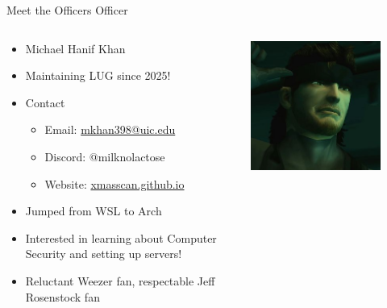 \documentclass{beamer}
\begin{document}
\begin{frame}{Meet the Officers}
	{\Huge Officer}
	\begin{columns}
		\begin{column}{0.5\textwidth}
			\begin{itemize}
				\item {\Large Michael Hanif Khan}
				\item Maintaining LUG since 2025!
				\item Contact
				      \begin{itemize}
					      \item Email: \href{mailto:mkhan398@uic.edu}{mkhan398@uic.edu}
					      \item Discord: @milknolactose
					      \item Website: \href{https://xmasscan.github.io/index.html}{xmasscan.github.io}
				      \end{itemize}
				\item Jumped from WSL to Arch
				\item Interested in learning about Computer Security and setting up servers!
				\item Reluctant Weezer fan, respectable Jeff Rosenstock fan
			\end{itemize}
		\end{column}
		\begin{column}{0.5\textwidth}
			\centering
			\includegraphics[width=0.8\textwidth]{snake.png}
		\end{column}
	\end{columns}
\end{frame}
\end{document}
